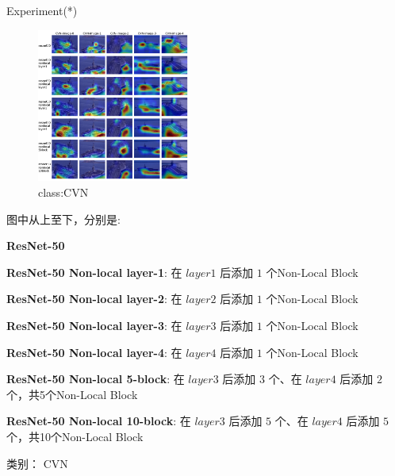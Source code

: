 \begin{frame}{Experiment(*)}
    \begin{multicols}{2}
    \begin{figure}
        \centering
        \includegraphics[width=0.45\textwidth]{docs/paperReading/Non-local/exp/CVN.png}
        \caption{class:CVN}
    \end{figure}

    \begin{scriptsize}
        图中从上至下，分别是:

        \begin{tiny}
            \textbf{ResNet-50}

            \textbf{ResNet-50 Non-local layer-1}: 在 $layer1$ 后添加 $1$ 个Non-Local Block

            \textbf{ResNet-50 Non-local layer-2}: 在 $layer2$ 后添加 $1$ 个Non-Local Block

            \textbf{ResNet-50 Non-local layer-3}: 在 $layer3$ 后添加 $1$ 个Non-Local Block
            
            \textbf{ResNet-50 Non-local layer-4}: 在 $layer4$ 后添加 $1$ 个Non-Local Block
            
            \textbf{ResNet-50 Non-local 5-block}: 在 $layer3$ 后添加 $3$ 个、在 $layer4$ 后添加 $2$ 个，共5个Non-Local Block
            
            \textbf{ResNet-50 Non-local 10-block}: 在 $layer3$ 后添加 $5$ 个、在 $layer4$ 后添加 $5$ 个，共10个Non-Local Block
        \end{tiny}

        类别： CVN 
    \end{scriptsize}
\end{multicols}
\end{frame}

